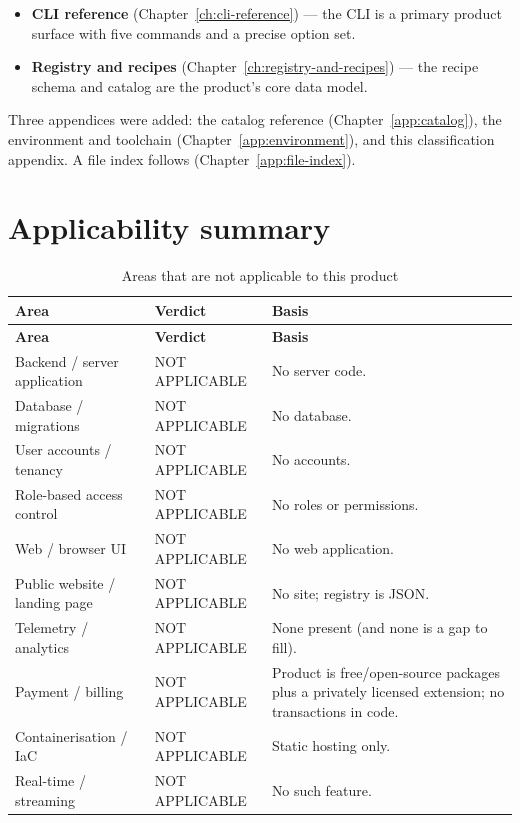 \begin{itemize}
  \item \textbf{CLI reference} (Chapter~\ref{ch:cli-reference}) --- the CLI is a
        primary product surface with five commands and a precise option set.
  \item \textbf{Registry and recipes}
        (Chapter~\ref{ch:registry-and-recipes}) --- the recipe schema and catalog
        are the product's core data model.
\end{itemize}

Three appendices were added: the catalog reference
(Chapter~\ref{app:catalog}), the environment and toolchain
(Chapter~\ref{app:environment}), and this classification appendix. A file index
follows (Chapter~\ref{app:file-index}).

\section{Applicability summary}

\begin{longtable}{@{}L{4.4cm}L{2.4cm}L{7.6cm}@{}}
\caption{Areas that are not applicable to this product}\\
\toprule
\textbf{Area} & \textbf{Verdict} & \textbf{Basis} \\
\midrule
\endfirsthead
\toprule
\textbf{Area} & \textbf{Verdict} & \textbf{Basis} \\
\midrule
\endhead
Backend / server application & NOT APPLICABLE & No server code. \\
Database / migrations & NOT APPLICABLE & No database. \\
User accounts / tenancy & NOT APPLICABLE & No accounts. \\
Role-based access control & NOT APPLICABLE & No roles or permissions. \\
Web / browser UI & NOT APPLICABLE & No web application. \\
Public website / landing page & NOT APPLICABLE & No site; registry is JSON. \\
Telemetry / analytics & NOT APPLICABLE & None present (and none is a gap to fill). \\
Payment / billing & NOT APPLICABLE & Product is free/open-source packages plus a
privately licensed extension; no transactions in code. \\
Containerisation / IaC & NOT APPLICABLE & Static hosting only. \\
Real-time / streaming & NOT APPLICABLE & No such feature. \\
\bottomrule
\end{longtable}

